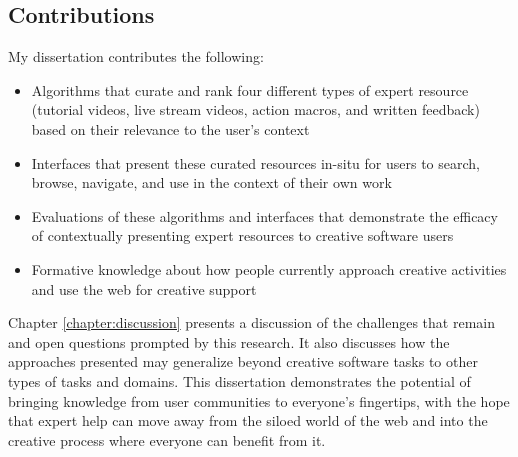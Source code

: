 \subsection{Contributions}
My dissertation contributes the following:
\begin{itemize}
\item Algorithms that curate and rank four different types of expert resource (tutorial videos, live stream videos, action macros, and written feedback) based on their relevance to the user's context
\item Interfaces that present these curated resources in-situ for users to search, browse, navigate, and use in the context of their own work
\item Evaluations of these algorithms and interfaces that demonstrate the efficacy of contextually presenting expert resources to creative software users
\item Formative knowledge about how people currently approach creative activities and use the web for creative support
\end{itemize}

Chapter \ref{chapter:discussion} presents a discussion of the challenges that remain and open questions prompted by this research. It also discusses how the approaches presented may generalize beyond creative software tasks to other types of tasks and domains. This dissertation demonstrates the potential of bringing knowledge from user communities to everyone's fingertips, with the hope that expert help can move away from the siloed world of the web and into the creative process where everyone can benefit from it.
